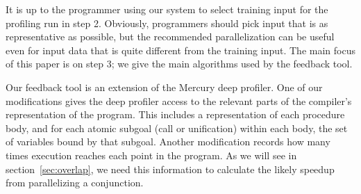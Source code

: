 \noindent
It is up to the programmer using our system
to select training input for the profiling run in step 2.
Obviously, programmers should pick input that is as representative as possible,
but the recommended parallelization can be useful
even for input data that is quite different from the training input.
The main focus of this paper is on step 3;
we give the main algorithms used by the feedback tool.

Our feedback tool is an extension of the Mercury deep profiler.
One of our modifications gives the deep profiler access
to the relevant parts of the compiler's representation of the program.
This includes a representation of each procedure body,
and for each atomic subgoal (call or unification) within each body,
the set of variables bound by that subgoal.
Another modification records
how many times execution reaches each point in the program.
As we will see in section~\ref{sec:overlap},
we need this information
to calculate the likely speedup from parallelizing a conjunction.



